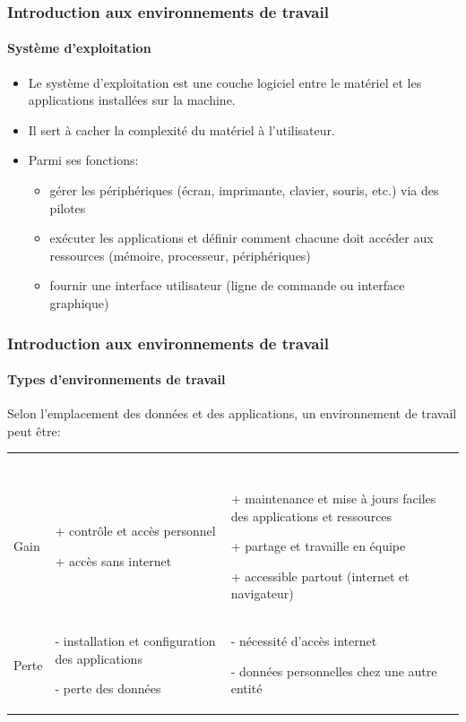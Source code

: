 \documentclass[xcolor=table]{beamer}
\begin{document}
\begin{frame}
\frametitle{Introduction aux environnements de travail}
\framesubtitle{Système d'exploitation}

\begin{itemize}
\item Le système d'exploitation est une couche logiciel entre le matériel et les applications installées sur la machine.

\item Il sert à cacher la complexité du matériel à l'utilisateur.

\item Parmi ses fonctions: 
\begin{itemize}
	\item gérer les périphériques (écran, imprimante, clavier, souris, etc.) via des pilotes
	\item exécuter les applications et définir comment chacune doit accéder aux ressources (mémoire, processeur, périphériques)
	\item fournir une interface utilisateur (ligne de commande ou interface graphique)
\end{itemize}
\end{itemize}

\end{frame}

\begin{frame}
\frametitle{Introduction aux environnements de travail}
\framesubtitle{Types d'environnements de travail}

Selon l'emplacement des données et des applications, un environnement de travail peut être: 


\begin{tabular}{p{}p{}p{}}
	\rowcolor{darkblue}
	& \textcolor{white}{Local} & \textcolor{white}{Distant} \\
	
	Gain &
	+ contrôle et accès personnel 
	
	+ accès sans internet

	 & 
	+ maintenance et mise à jours faciles des applications et ressources
	
	+ partage et travaille en équipe
	
	+ accessible partout (internet et navigateur)
	 \\
	
	Perte &
	- installation et configuration des applications
	
	- perte des données
	&
	- nécessité d'accès internet
	
	- données personnelles chez une autre entité 
	\\
\end{tabular}

\end{frame}
\end{document}
